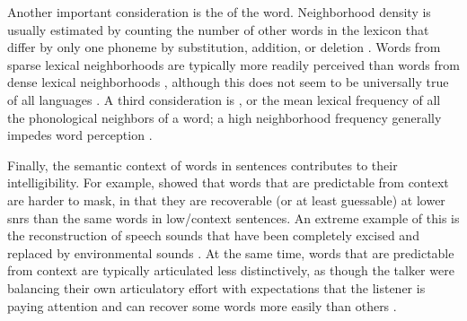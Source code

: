 Another important consideration is the  of the word.  Neighborhood density is usually estimated by counting the number of other words in the lexicon that differ by only one phoneme by substitution, addition, or deletion \citep{LucePisoni1998}.  Words from sparse lexical neighborhoods are typically more readily perceived than words from dense lexical neighborhoods %
\citep{VitevitchLuce1998, ZieglerEtAl2003}, although this does not seem to be universally true of all languages \citep{VitevitchRodriguez2005}.  A third consideration is , or the mean lexical frequency of all the phonological neighbors of a word; a high neighborhood frequency generally impedes word perception \citep{LucePisoni1998}.  


Finally, the semantic context of words in sentences contributes to their intelligibility.  For example, \citet{LewisEtAl1988} showed that words that are predictable from context are harder to mask, in that they are recoverable (or at least guessable) at lower \ac{snr}s than the same words in low\-/context sentences.  An extreme example of this is the reconstruction of speech sounds that have been completely excised and replaced by environmental sounds \citep{Warren1970}.  At the same time, words that are predictable from context are typically articulated less distinctively, as though the talker were balancing their own articulatory effort with expectations that the listener is paying attention and can recover some words more easily than others \citep{Wright2004a}.   


